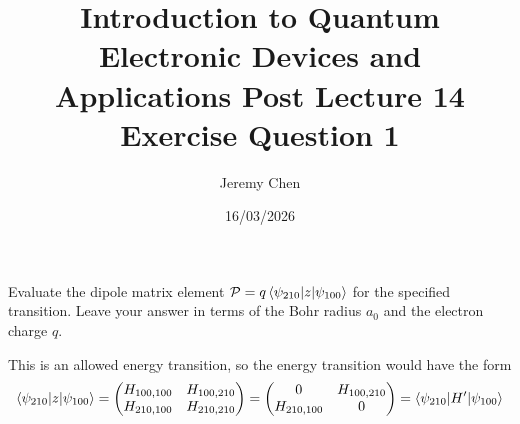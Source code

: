 \documentclass[10pt,letterpaper]{article}
\title{Introduction to Quantum Electronic Devices and Applications Post Lecture 14 Exercise Question 1}
\author{Jeremy Chen}
\date{16/03/2026}
\begin{document}
	\maketitle

\noindent Evaluate the dipole matrix element $\mathcal{P} = q\braket{\psi_{210} | z | \psi_{100}}$ for the specified transition. Leave your answer in terms of the Bohr radius $a_{0}$ and the electron charge $q$. 

\color{violet}
This is an allowed energy transition, so the energy transition would have the form
\begin{gather*}
\braket{\psi_{210} | z | \psi_{100}} = \begin{pmatrix}
H_{100, 100} & H_{100, 210} \\
H_{210, 100} & H_{210, 210}
\end{pmatrix} = \begin{pmatrix}
0 & H_{100, 210} \\
H_{210, 100} & 0
\end{pmatrix} = \braket{\psi_{210} | H' | \psi_{100}}
\end{gather*}
\color{black}
\end{document}

